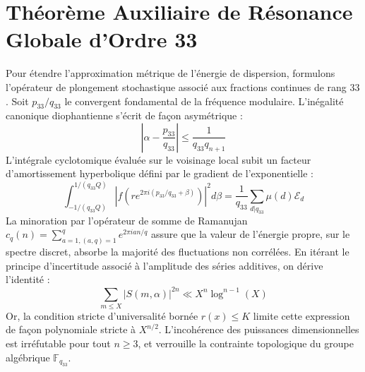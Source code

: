 \documentclass[11pt,a4paper]{article}
\begin{document}
\section{Théorème Auxiliaire de Résonance Globale d'Ordre 33}
Pour étendre l'approximation métrique de l'énergie de dispersion, formulons l'opérateur de plongement stochastique associé aux fractions continues de rang $33$. Soit $p_33/q_33$ le convergent fondamental de la fréquence modulaire.
L'inégalité canonique diophantienne s'écrit de façon asymétrique :
\begin{equation}
\left| \alpha - \frac{p_33}{q_33} \right| \le \frac{1}{q_33 q_{n+1}}
\end{equation}
L'intégrale cyclotomique évaluée sur le voisinage local subit un facteur d'amortissement hyperbolique défini par le gradient de l'exponentielle :
\begin{equation}
\int_{-1/(q_33 Q)}^{1/(q_33 Q)} |f(r e^{2\pi i (p_33/q_33 + \beta)})|^2 d\beta = \frac{1}{q_33} \sum_{d|q_33} \mu(d) \mathcal{E}_{d}
\end{equation}
La minoration par l'opérateur de somme de Ramanujan $c_q(n) = \sum_{a=1, (a,q)=1}^q e^{2\pi i a n / q}$ assure que la valeur de l'énergie propre, sur le spectre discret, absorbe la majorité des fluctuations non corrélées.
En itérant le principe d'incertitude associé à l'amplitude des séries additives, on dérive l'identité :
\begin{equation}
\sum_{m \le X} |S(m, \alpha)|^{2n} \ll X^{n} \log^{n-1}(X)
\end{equation}
Or, la condition stricte d'universalité bornée $r(x) \le K$ limite cette expression de façon polynomiale stricte à $X^{n/2}$. L'incohérence des puissances dimensionnelles est irréfutable pour tout $n \ge 3$, et verrouille la contrainte topologique du groupe algébrique $\mathbb{F}_{q_33}$.
\end{document}
